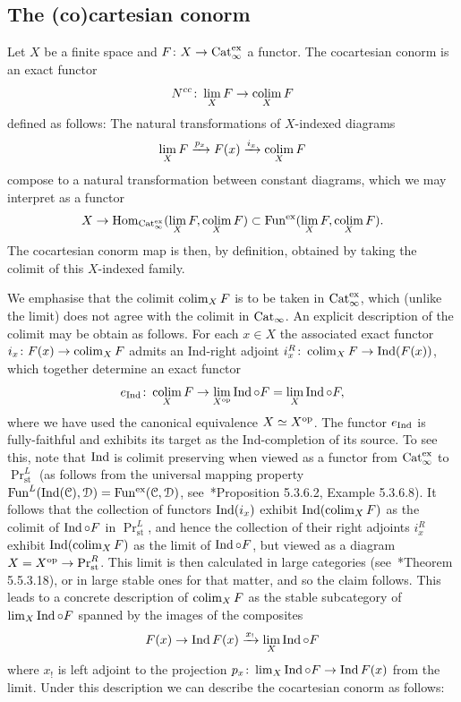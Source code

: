 \subsection{The (co)cartesian conorm}

Let $X$ be a finite space and $F\colon X\to \mathrm{Cat}_\infty^{\mathrm{ex}}$ a functor. The cocartesian conorm is an exact functor
\[
N^{cc}\colon \lim_X F \to \mathop{\mathrm{colim}}_X F
\]
defined as follows: The natural transformations of $X$-indexed diagrams %
\[
\lim_X F \xrightarrow{p_x} F(x) \xrightarrow{i_x} \mathop{\mathrm{colim}}_X F
\]
compose to a natural transformation between constant diagrams, which we may interpret as a functor 
\[
X \to \operatorname{Hom}_{\mathrm{Cat}_\infty^{\mathrm{ex}}}(\lim_X F, \mathop{\mathrm{colim}}_X F) \subset \operatorname{Fun^{ex}}(\lim_X F, \mathop{\mathrm{colim}}_X F).
\]
The cocartesian conorm map is then, by definition, obtained by taking the colimit of this $X$-indexed family.


We emphasise that the colimit $\mathop{\mathrm{colim}}_X F$ is to be taken in $\mathrm{Cat}_\infty^{\mathrm{ex}}$, which (unlike the limit) does not agree with the colimit in $\mathrm{Cat}_\infty$. An explicit description of the colimit may be obtain as follows. For each $x \in X$ the associated exact functor $i_x\colon F(x) \to \mathop{\mathrm{colim}}_X F$ admits an Ind-right adjoint $i_x^R\colon \mathop{\mathrm{colim}}_X F \to \operatorname{Ind}(F(x))$, which together determine an exact functor
\[
e_{\operatorname{Ind}}\colon \mathop{\mathrm{colim}}_X F \to \lim_{X^\mathrm{op}} \operatorname{Ind}\circ F = \lim_X\operatorname{Ind} \circ F ,
\]
where we have used the canonical equivalence $X \simeq X^\mathrm{op}$.
The functor $e_{\operatorname{Ind}}$ is fully-faithful and exhibits its target as the Ind-completion of its source. To see this, note that $\operatorname{Ind}$ is colimit preserving when viewed as a functor from $\mathrm{Cat}_\infty^{\mathrm{ex}}$ to $\Pr^L_{\mathrm{st}}$ (as follows from the universal mapping property $\operatorname{Fun}^L(\operatorname{Ind}(\mathcal C),\mathcal{D}) = \operatorname{Fun^{ex}}(\mathcal C,\mathcal{D})$, see~\cite{HTT}*{Proposition 5.3.6.2, Example 5.3.6.8}). It follows that the collection of functors $\operatorname{Ind}(i_x)$ exhibit $\operatorname{Ind}(\mathop{\mathrm{colim}}_X F)$ as the colimit of $\operatorname{Ind}\circ F$ in $\Pr^L_{\mathrm{st}}$, and hence the collection of their right adjoints $i_x^R$ exhibit $\operatorname{Ind}(\mathop{\mathrm{colim}}_X F)$ as the limit of $\operatorname{Ind} \circ F$, but viewed as a diagram $X=X^\mathrm{op} \to \Pr^R_{\mathrm{st}}$. This limit is then calculated in large categories %
(see~\cite{HTT}*{Theorem 5.5.3.18}), or in large stable ones for that matter,
and so the claim follows. This leads to a concrete description of $\mathop{\mathrm{colim}}_X F$ as the stable subcategory of 
$\lim_{X} \operatorname{Ind}\circ F$
spanned by the images of the composites 
\[
F(x) \to \operatorname{Ind} F(x) \xrightarrow{x_!} \lim_{X} \operatorname{Ind}\circ F
\]
where $x_!$ is left adjoint to the projection $p_x\colon \lim_{X} \operatorname{Ind}\circ F \to \operatorname{Ind} F(x)$ from the limit. %
Under this description we can describe the cocartesian conorm as follows:

